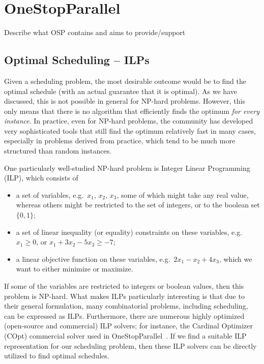 \documentclass[oneside,reqno, a4paper]{amsart}
\numberwithin{equation}{section}
\let\Oldsection\section
\renewcommand{\section}{\FloatBarrier\Oldsection}
\begin{document}
\section{OneStopParallel}
\label{sec:onestopparallel}

Describe what OSP contains and aims to provide/support

\subsection{Optimal Scheduling -- ILPs}

Given a scheduling problem, the most desirable outcome would be to find the optimal schedule (with an actual guarantee that it is optimal). As we have discussed, this is not possible in general for NP-hard problems. However, this only means that there is no algorithm that efficiently finds the optimum \emph{for every instance}. In practice, even for NP-hard problems, the community has developed very sophisticated tools that still find the optimum relatively fast in many cases, especially in problems derived from practice, which tend to be much more structured than random instances.

One particularly well-studied NP-hard problem is Integer Linear Programming (ILP), which consists of
\begin{itemize}
	\item a set of variables, e.g.\ {$x_1$, $x_2$, $x_3$}, some of which might take any real value, whereas others might be restricted to the set of integers, or to the boolean set $\{ 0,1\}$;
	\item a set of linear inequality (or equality) constraints on these variables, e.g.\ $x_1 \geq 0$, or $x_1 + 3x_2 - 5x_3 \geq -7$;
	\item a linear objective function on these variables, e.g.\ $2x_1-x_2+4x_3$, which we want to either minimize or maximize.
\end{itemize}
If some of the variables are restricted to integers or boolean values, then this problem is NP-hard. What makes ILPs particularly interesting is that due to their general formulation, many combinatorial problems, including scheduling, can be expressed as ILPs. Furthermore, there are numerous highly optimized (open-source and commercial) ILP solvers; for instance, the Cardinal Optimizer (COpt) commercial solver used in OneStopParallel~\cite{copt}. If we find a suitable ILP representation for our scheduling problem, then these ILP solvers can be directly utilized to find optimal schedules.
\end{document}
